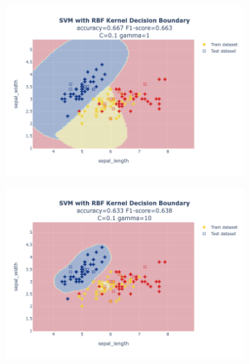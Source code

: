 \documentclass{article}
\begin{document}
\begin{figure}
\begin{subfigure}{0.3\textwidth}
        \includegraphics[scale=.13]{images/implementation/q1/rbf_kernel/sepal_length_sepal_width_0.1_1.png}
    \end{subfigure}
    \hfill
    \begin{subfigure}{0.3\textwidth}
        \centering
        \includegraphics[scale=.13]{images/implementation/q1/rbf_kernel/sepal_length_sepal_width_0.1_10.png}
    \end{subfigure}
    \newline
    \begin{subfigure}{0.3\textwidth}
        \centering

\end{subfigure}
\end{figure}
\end{document}
